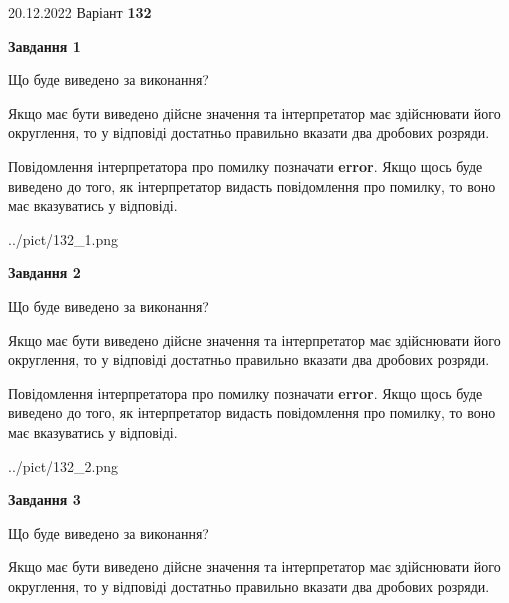 \documentclass[12pt, ukrainian]{article}
\begin{document}
{20.12.2022 Варіант \No \textbf { 132 }\par}
{
\begin {Large}

{\begin {center}\textbf{Завдання 1}\end {center}}\par
Що буде виведено за виконання? \par

Якщо має бути виведено дійсне значення та інтерпретатор має здійснювати його округлення, 
то у відповіді достатньо правильно вказати два дробових розряди.

Повідомлення інтерпретатора про помилку позначати \textbf{error}.
Якщо щось буде виведено до того, як інтерпретатор видасть повідомлення про помилку, 
то воно має вказуватись у відповіді. \par

\begin{center}
	{../pict/132_1.png}
\end{center}
\newpage

{\begin {center}\textbf{Завдання 2}\end {center}}\par
Що буде виведено за виконання? \par

Якщо має бути виведено дійсне значення та інтерпретатор має здійснювати його округлення, 
то у відповіді достатньо правильно вказати два дробових розряди.

Повідомлення інтерпретатора про помилку позначати \textbf{error}.
Якщо щось буде виведено до того, як інтерпретатор видасть повідомлення про помилку, 
то воно має вказуватись у відповіді. \par

\begin{center}
	{../pict/132_2.png}
\end{center}
\newpage

{\begin {center}\textbf{Завдання 3}\end {center}}\par
Що буде виведено за виконання? \par

Якщо має бути виведено дійсне значення та інтерпретатор має здійснювати його округлення, 
то у відповіді достатньо правильно вказати два дробових розряди.


\end{Large}}
\end{document}
